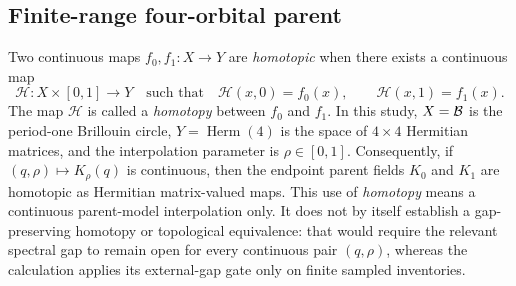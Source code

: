 \subsection{Finite-range four-orbital parent}

Two continuous maps $f_0,f_1:X\to Y$ are \emph{homotopic} when there exists a
continuous map
\begin{equation}
 \mathcal H:X\times[0,1]\longrightarrow Y
 \quad\text{such that}\quad
 \mathcal H(x,0)=f_0(x),\qquad \mathcal H(x,1)=f_1(x).
 \label{eq:homotopy-definition}
\end{equation}
The map $\mathcal H$ is called a \emph{homotopy} between $f_0$ and $f_1$.  In this
study, $X=\mathcal B$ is the period-one Brillouin circle, $Y=\operatorname{Herm}(4)$ is
the space of $4\times4$ Hermitian matrices, and the interpolation parameter is
$\rho\in[0,1]$.  Consequently, if $(q,\rho)\mapsto K_\rho(q)$ is continuous, then the
endpoint parent fields $K_0$ and $K_1$ are homotopic as Hermitian matrix-valued maps.
This use of \emph{homotopy} means a continuous parent-model interpolation only.  It does
not by itself establish a gap-preserving homotopy or topological equivalence: that would
require the relevant spectral gap to remain open for every continuous pair
$(q,\rho)$, whereas the calculation applies its external-gap gate only on finite sampled
inventories.

